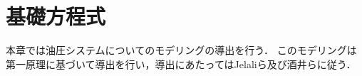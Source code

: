 \chapter{基礎方程式}
本章では油圧システムについてのモデリングの導出を行う．
このモデリングは第一原理に基づいて導出を行い，導出にあたってはJelaliら\cite{}及び酒井ら\cite{}に従う．